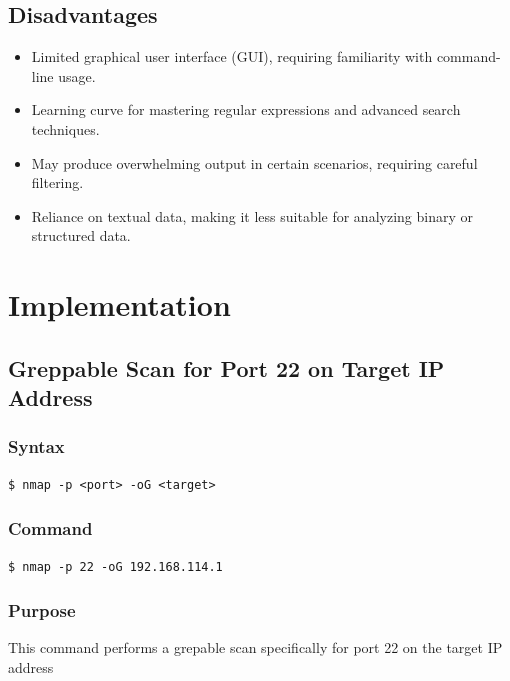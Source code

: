 \documentclass[11pt]{article}
\begin{document}
\subsection{Disadvantages}
\begin{itemize}
    \item Limited graphical user interface (GUI), requiring familiarity with command-line usage.
    \item Learning curve for mastering regular expressions and advanced search techniques.
    \item May produce overwhelming output in certain scenarios, requiring careful filtering.
    \item Reliance on textual data, making it less suitable for analyzing binary or structured data.
\end{itemize}


\section{Implementation}

\subsection{Greppable Scan for Port 22 on Target IP Address}

\subsubsection*{Syntax}
\begin{verbatim}
$ nmap -p <port> -oG <target>
\end{verbatim}

\subsubsection*{Command}
\begin{verbatim}
$ nmap -p 22 -oG 192.168.114.1 
\end{verbatim}

\subsubsection*{Purpose}
This command performs a grepable scan specifically for port 22 on the target IP address
\end{document}
